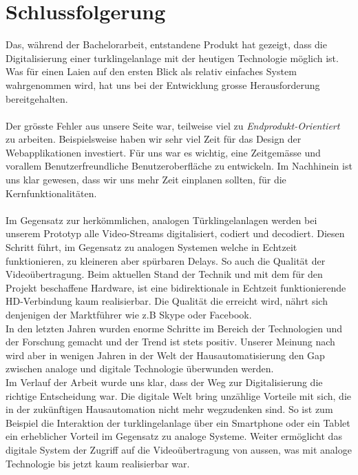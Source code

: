 \newpage

\section{Schlussfolgerung}
\label{sec:schlussfolgerung}
Das, während der Bachelorarbeit, entstandene Produkt hat gezeigt, dass die Digitalisierung einer \gls{turklingelanlage} mit der heutigen Technologie möglich ist. Was für einen Laien auf den ersten Blick als relativ einfaches System wahrgenommen wird, hat uns bei der Entwicklung grosse Herausforderung bereitgehalten. 
\\
\\
Der grösste Fehler aus unsere Seite war, teilweise viel zu \textit{Endprodukt-Orientiert} zu arbeiten. Beispielsweise haben wir sehr viel Zeit für das Design der Webapplikationen investiert. Für uns war es wichtig, eine Zeitgemässe und vorallem Benutzerfreundliche Benutzeroberfläche zu entwickeln. Im Nachhinein ist uns klar gewesen, dass wir uns mehr Zeit einplanen sollten, für die Kernfunktionalitäten. 
\\
\\
Im Gegensatz zur herkömmlichen, analogen Türklingelanlagen werden bei unserem Prototyp alle Video-Streams digitalisiert, codiert und decodiert. Diesen Schritt führt, im Gegensatz zu analogen Systemen welche in Echtzeit funktionieren, zu kleineren aber spürbaren Delays. So auch die Qualität der Videoübertragung. Beim aktuellen Stand der Technik und mit dem für den Projekt beschaffene Hardware, ist eine bidirektionale in Echtzeit funktionierende HD-Verbindung kaum realisierbar. Die Qualität die erreicht wird, nährt sich denjenigen der Marktführer wie z.B Skype oder Facebook.
\\
In den letzten Jahren wurden enorme Schritte im Bereich der Technologien und der Forschung gemacht und der Trend ist stets positiv. Unserer Meinung nach wird aber in wenigen Jahren in der Welt der Hausautomatisierung den Gap zwischen analoge und digitale Technologie überwunden werden.
\\
Im Verlauf der Arbeit wurde uns klar, dass der Weg zur Digitalisierung die richtige Entscheidung war. Die digitale Welt bring unzählige Vorteile mit sich, die in der zukünftigen Hausautomation nicht mehr wegzudenken sind. So ist zum Beispiel die Interaktion der \gls{turklingelanlage} über ein Smartphone oder ein Tablet ein erheblicher Vorteil im Gegensatz zu analoge Systeme. Weiter ermöglicht das digitale System der Zugriff auf die Videoübertragung von aussen, was mit analoge Technologie bis jetzt kaum realisierbar war.
\\
\newpage

  
